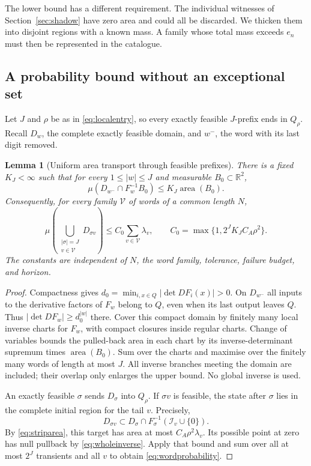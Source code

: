 \documentclass[11pt]{amsart}
\newtheorem{lemma}[theorem]{Lemma}
\theoremstyle{definition}
\theoremstyle{remark}
\newcommand{\R}{\mathbb R}
\newcommand{\area}{\operatorname{area}}
\numberwithin{equation}{section}
\begin{document}
The lower bound has a different requirement. The individual
witnesses of Section~\ref{sec:shadow} have zero area and could all
be discarded. We thicken them into disjoint regions with a known
mass. A family whose total mass exceeds $e_n$ must then be
represented in the catalogue.

\subsection{A probability bound without an exceptional set}
Let $J$ and $\rho$ be as in \eqref{eq:localentry}, so every
exactly feasible $J$-prefix ends in $Q_\rho$.
Recall $D_w$, the complete exactly feasible domain, and $w^-$,
the word with its last digit removed.

\begin{lemma}[Uniform area transport through feasible prefixes]\label{lem:probtransport}
There is a fixed $K_J<\infty$ such that for every $1\le|w|\le J$
and measurable $B_0\subset\R^2$,
\begin{equation}\label{eq:wholeinverse}
\mu(D_{w^-}\cap F_w^{-1}B_0)\le K_J\area(B_0).
\end{equation}
Consequently, for every family $\mathcal V$ of words of a common
length $N$,
\begin{equation}\label{eq:wordprobability}
\mu\!\left(\bigcup_{\substack{|\sigma|=J\\v\in\mathcal V}}
D_{\sigma v}\right)\le C_0\sum_{v\in\mathcal V}\lambda_v,
\qquad C_0=\max\{1,2^JK_JC_A\rho^2\}.
\end{equation}
The constants are independent of $N$, the word family, tolerance,
failure budget, and horizon.
\end{lemma}
\begin{proof}
Compactness gives $d_0=\min_{i,x\in Q}|\det DF_i(x)|>0$.
On $D_{w^-}$ all inputs to the derivative factors of $F_w$
belong to $Q$, even when its last output leaves $Q$. Thus
$|\det DF_w|\ge d_0^{|w|}$ there. Cover this compact domain by
finitely many local inverse charts for $F_w$, with compact closures
inside regular charts. Change of variables bounds the pulled-back
area in each chart by its inverse-determinant supremum times
$\area(B_0)$. Sum over the charts and maximise over the finitely
many words of length at most $J$. All inverse branches meeting the
domain are included; their overlap only enlarges the upper bound.
No global inverse is used.

An exactly feasible $\sigma$ sends $D_\sigma$ into $Q_\rho$.
If $\sigma v$ is feasible, the state after $\sigma$ lies in the
complete initial region for the tail $v$. Precisely,
\[
D_{\sigma v}\subset
D_\sigma\cap F_\sigma^{-1}(\mathcal I_v\cup\{0\}).
\]
By \eqref{eq:striparea}, this target has area at most
$C_A\rho^2\lambda_v$. Its possible point at zero has null
pullback by \eqref{eq:wholeinverse}. Apply that bound and sum
over all at most $2^J$ transients and all $v$ to obtain
\eqref{eq:wordprobability}.
\end{proof}
\end{document}
